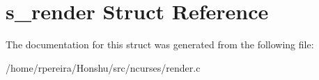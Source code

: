 \hypertarget{structs__render}{}\section{s\+\_\+render Struct Reference}
\label{structs__render}


The documentation for this struct was generated from the following file\+:\begin{DoxyCompactItemize}
\item 
/home/rpereira/\+Honshu/src/ncurses/render.\+c\end{DoxyCompactItemize}
